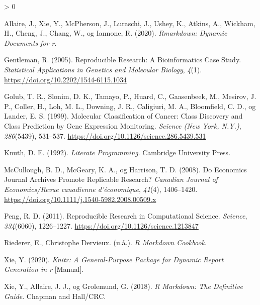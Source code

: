 \documentclass[
  12pt,
  norsk,
]{article}
\newlength{\cslhangindent}
\newenvironment{CSLReferences}[2] %
 {%
  \setlength{\parindent}{0pt}
  \ifodd #1 \everypar{\setlength{\hangindent}{\cslhangindent}}\ignorespaces\fi
  \ifnum #2 > 0
  \setlength{\parskip}{#2\baselineskip}
  \fi
 }%
 {}
\begin{document}
\hypertarget{refs}{}
\begin{CSLReferences}{1}{0}
\leavevmode\hypertarget{ref-allaire2020}{}%
Allaire, J., Xie, Y., McPherson, J., Luraschi, J., Ushey, K., Atkins,
A., Wickham, H., Cheng, J., Chang, W., og Iannone, R. (2020).
\emph{Rmarkdown: {Dynamic} Documents for r}.

\leavevmode\hypertarget{ref-gentleman2005}{}%
Gentleman, R. (2005). Reproducible {Research}: {A Bioinformatics Case
Study}. \emph{Statistical Applications in Genetics and Molecular
Biology}, \emph{4}(1). \url{https://doi.org/10.2202/1544-6115.1034}

\leavevmode\hypertarget{ref-golub1999}{}%
Golub, T. R., Slonim, D. K., Tamayo, P., Huard, C., Gaasenbeek, M.,
Mesirov, J. P., Coller, H., Loh, M. L., Downing, J. R., Caligiuri, M.
A., Bloomfield, C. D., og Lander, E. S. (1999). Molecular Classification
of Cancer: Class Discovery and Class Prediction by Gene Expression
Monitoring. \emph{Science (New York, N.Y.)}, \emph{286}(5439), 531--537.
\url{https://doi.org/10.1126/science.286.5439.531}

\leavevmode\hypertarget{ref-knuth1992}{}%
Knuth, D. E. (1992). \emph{Literate {Programming}}. {Cambridge
University Press}.

\leavevmode\hypertarget{ref-mccullough2008}{}%
McCullough, B. D., McGeary, K. A., og Harrison, T. D. (2008). Do
Economics Journal Archives Promote Replicable Research? \emph{Canadian
Journal of Economics/Revue canadienne d'économique}, \emph{41}(4),
1406--1420. \url{https://doi.org/10.1111/j.1540-5982.2008.00509.x}

\leavevmode\hypertarget{ref-peng2011}{}%
Peng, R. D. (2011). Reproducible {Research} in {Computational Science}.
\emph{Science}, \emph{334}(6060), 1226--1227.
\url{https://doi.org/10.1126/science.1213847}

\leavevmode\hypertarget{ref-riederer}{}%
Riederer, E., Christophe Dervieux. (u.å.). \emph{R {Markdown Cookbook}}.

\leavevmode\hypertarget{ref-xie2020}{}%
Xie, Y. (2020). \emph{Knitr: {A} General-Purpose Package for Dynamic
Report Generation in r} {[}Manual{]}.

\leavevmode\hypertarget{ref-xie2018}{}%
Xie, Y., Allaire, J. J., og Grolemund, G. (2018). \emph{R Markdown:
{The} Definitive Guide}. {Chapman and Hall/CRC}.

\end{CSLReferences}
\end{document}
